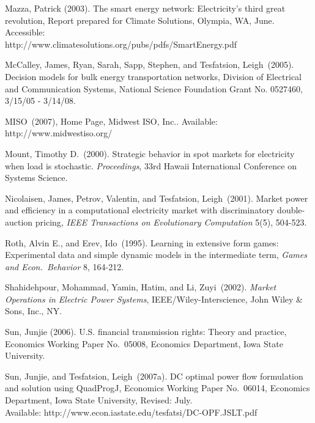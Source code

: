 \documentclass[12pt]{article}
\begin{document}
\begin{description}
\item Mazza, Patrick (2003).  The smart energy network: Electricity's third great revolution, 
Report prepared for Climate Solutions, Olympia, WA, June.  Accessible:\\ 
http://www.climatesolutions.org/pubs/pdfs/SmartEnergy.pdf

\item McCalley, James, Ryan, Sarah, Sapp, Stephen, and Tesfatsion, Leigh~(2005).  Decision models 
for bulk energy transportation networks, Division of Electrical and Communication Systems, 
National Science Foundation Grant No. 0527460, 3/15/05 - 3/14/08.

\item MISO~(2007), Home Page, Midwest ISO, Inc..  Available:
http://www.midwestiso.org/

\item Mount, Timothy D.~(2000).  Strategic behavior in spot markets for electricity when load is stochastic. 
\textit{Proceedings\/}, 33rd Hawaii International Conference on Systems Science.

\item Nicolaisen, James, Petrov, Valentin, and Tesfatsion, Leigh~(2001).  Market power and
efficiency in a computational electricity market with discriminatory
double-auction pricing, {\it IEEE Transactions on Evolutionary Computation\/}
5(5), 504-523.

\item Roth, Alvin E., and Erev, Ido~(1995).  Learning in extensive form games:
Experimental data and simple dynamic models in the intermediate term,
{\it Games and Econ.\ Behavior\/} 8, 164-212.

\item Shahidehpour, Mohammad, Yamin, Hatim, and Li, Zuyi~(2002).  \textit{Market Operations in Electric Power Systems\/}, IEEE/Wiley-Interscience, John Wiley \& Sons, Inc., NY.

\item Sun, Junjie (2006).  U.S. financial transmission rights: Theory and practice, Economics
Working Paper No.~05008, Economics Department, Iowa State University.

\item Sun, Junjie, and Tesfatsion, Leigh~(2007a). DC optimal power flow formulation and solution using QuadProgJ,  Economics Working Paper No.~06014, Economics Department, Iowa State University, Revised: July.\\
Available: http://www.econ.iastate.edu/tesfatsi/DC-OPF.JSLT.pdf


\end{description}
\end{document}
